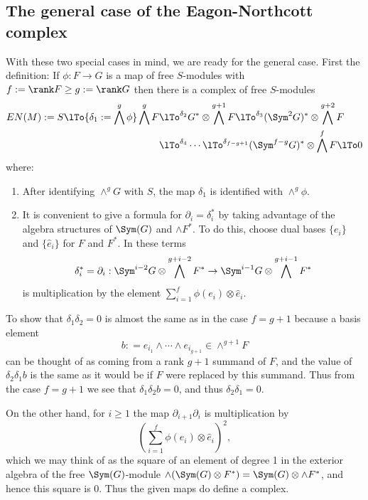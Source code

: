 \subsection{The general case of the Eagon-Northcott complex}
With these two special cases in mind, we are ready for the general case. First the definition:
If $\phi: F\to G$ is a map of free $S$-modules with $f:=\rank F\geq  g:= \rank G$ then there is
a complex of free $S$-modules
\begin{align*}
EN(M) := 
S \lTo{\delta_{1}:= \bigwedge^g \phi} 
 \bigwedge^g F&
 \lTo^{\delta_{2}}
 G^*\otimes \bigwedge^{g+1} F  \lTo^{\delta_{3}}
  (\Sym^2G)^*\otimes\bigwedge^{g+2}F  \\
 &\lTo^{\delta_{4}}\cdots\lTo^{\delta_{f-g+1}} 
(\Sym^{f-g}G)^*\otimes\bigwedge^fF 
 \lTo 0
\end{align*}
where:
\begin{enumerate}
 
\item After identifying $\wedge^{g}G$ with $S$, the map $\delta_{1}$ is identified with $\wedge^{g}\phi$.

\item It is convenient to give a formula for $\partial_{i} = \delta_{i}^{*}$ by taking advantage of the 
algebra structures of $\Sym(G)$ and $\wedge F^{*}$. To do this, choose dual bases $\{e_{i}\}$ and $\{\hat e_{i}\}$ for $F$ and $F^{*}$. In these terms
$$
\delta_{i}^{*} = \partial_{i}: 
\Sym^{i-2}G \otimes \bigwedge^{g+i-2}F^{*} \to 
\Sym^{i-1}G \otimes \bigwedge^{g+i-1}F^{*}
$$
 is multiplication by the element
$\sum_{i = 1}^{f} \phi(e_{i}) \otimes \hat e_{i}$.
\end{enumerate}

To show that $\delta_{1}\delta_{2} = 0$ is almost the same as in the case $f = g+1$ because
a basis element 
$$
b: = e_{i_{1}}\wedge \cdots \wedge e_{i_{g+1}} \in \wedge^{g+1}F
$$
can be thought of as coming from a rank $g+1$ summand of $F$, and the value of $\delta_{2}\delta_{1}b$
is the same as it would be if $F$ were replaced by this summand. Thus from the case $f=g+1$ we see
that $\delta_{1}\delta_{2}b = 0$, and thus $\delta_{2}\delta_{1} = 0$.

On the other hand, for $i\geq 1$ the map $\partial_{i+1}\partial_{i}$ is multiplication by
$$
\left(\sum_{i = 1}^{f} \phi(e_{i}) \otimes \hat e_{i}\right)^{2},
$$
which we may think of as the square of an element of degree 1 in the exterior algebra
of the free $\Sym(G)$-module $\wedge(\Sym(G)\otimes F^{*}) = \Sym(G) \otimes \wedge F^{*}$, and hence this square is 0.
Thus the given maps do define a complex.

